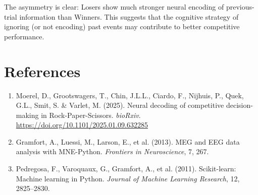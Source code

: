 \documentclass[11pt,a4paper]{article}
\begin{document}
The asymmetry is clear: Losers show much stronger neural encoding of previous-trial information than Winners. This suggests that the cognitive strategy of ignoring (or not encoding) past events may contribute to better competitive performance.


\section{References}
\label{sec:references}

\begin{enumerate}
    \item Moerel, D., Grootswagers, T., Chin, J.L.L., Ciardo, F., Nijhuis, P., Quek, G.L., Smit, S. \& Varlet, M. (2025). Neural decoding of competitive decision-making in Rock-Paper-Scissors. \textit{bioRxiv}. \url{https://doi.org/10.1101/2025.01.09.632285}

    \item Gramfort, A., Luessi, M., Larson, E., et al. (2013). MEG and EEG data analysis with MNE-Python. \textit{Frontiers in Neuroscience}, 7, 267.

    \item Pedregosa, F., Varoquaux, G., Gramfort, A., et al. (2011). Scikit-learn: Machine learning in Python. \textit{Journal of Machine Learning Research}, 12, 2825--2830.
\end{enumerate}

\end{document}
